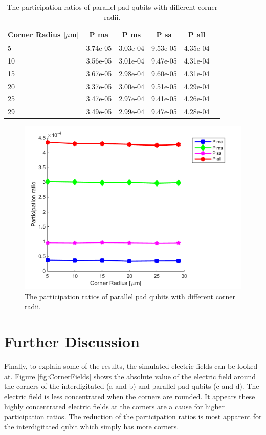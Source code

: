  \begin{table}
 	\begin{center}
 		\begin{tabular}{ | l || c | c | c | c | c |}
 			\hline
 			Corner Radius [\(\mu\)m] & P ma & P ms & P sa & P all \\ \hline
 			5 & 3.74e-05 & 3.03e-04 & 9.53e-05 & 4.35e-04 \\
 			10 & 3.56e-05 & 3.01e-04 & 9.47e-05 & 4.31e-04 \\
 			15 & 3.67e-05 & 2.98e-04 & 9.60e-05 & 4.31e-04 \\
 			20 & 3.37e-05 & 3.00e-04 & 9.51e-05 & 4.29e-04 \\
 			25 & 3.47e-05 & 2.97e-04 & 9.41e-05 & 4.26e-04 \\
 			29 & 3.49e-05 & 2.99e-04 & 9.47e-05 & 4.28e-04 \\
 			\hline
 		\end{tabular}
 	\end{center}
 	\caption{The participation ratios of parallel pad qubits with different corner radii.}
 	\label{table:IBMCornerRadius}
 \end{table}
 
 \begin{figure}
 	\centering
 	\includegraphics[scale = 0.7]{Figures/Ratio_plots/IBMCornerRadius_legend}
 	\caption{The participation ratios of parallel pad qubits with different corner radii.}
 	\label{fig:IBMCornerRadius_legend}
 \end{figure}
 
\clearpage
\section{Further Discussion}
Finally, to explain some of the results, the simulated electric fields can be looked at. Figure \ref{fig:CornerFields} shows the absolute value of the electric field around the corners of the interdigitated (a and b) and parallel pad qubits (c and d). The electric field is less concentrated when the corners are rounded. It appears these highly concentrated electric fields at the corners are a cause for higher participation ratios. The reduction of the participation ratios is most apparent for the interdigitated qubit which simply has more corners.

